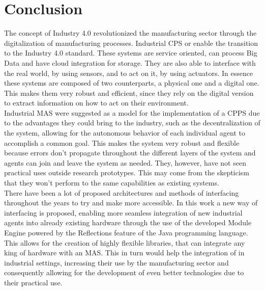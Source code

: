 


\glsresetall

\chapter{Conclusion}
\label{cha:conclusion}

The concept of Industry 4.0 revolutionized the manufacturing sector through the digitalization of manufacturing processes. Industrial \acrshort{CPS} or  enable the transition to the Industry 4.0 standard. These systems are service oriented, can process Big Data and have cloud integration for storage. They are also able to interface with the real world, by using sensors, and to act on it, by using actuators. In essence these systems are composed of two counterparts, a physical one and a digital one. This makes them very robust and efficient, since they rely on the digital version to extract information on how to act on their environment.\\

Industrial \acrshort{MAS} were suggested as a model for the implementation of a \acrshort{CPPS} due to the advantages they could bring to the industry, such as the decentralization of the system, allowing for the autonomous behavior of each individual agent to accomplish a common goal. This makes the system very robust and flexible because errors don't propagate throughout the different layers of the system and agents can join and leave the system as needed. They, however, have not seen practical uses outside research prototypes. This may come from the skepticism that they won't perform to the same capabilities as existing systems.\\

There have been a lot of proposed architectures and methods of interfacing throughout the years to try and make  more accessible. In this work  a new way of interfacing is proposed, enabling more seamless integration of new industrial agents into already existing hardware through the use of the developed Module Engine powered by the Reflections feature of the Java programming language. This allows for the creation of highly flexible libraries, that can integrate any king of hardware with an \acrshort{MAS}. This in turn would help the integration of  in industrial settings, increasing their use by the manufacturing sector and consequently allowing for the development of even better technologies due to their practical use.